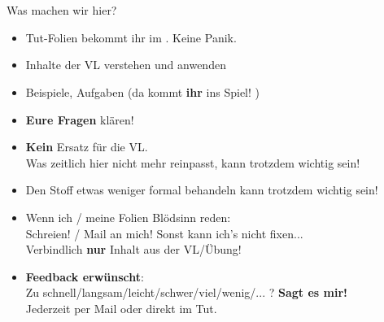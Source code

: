 

\newcommand{\handout}{}





\section{}


\begin{frame}[t]{Was machen wir hier?}
	\begin{itemize}[<+->]
		\item Tut-Folien bekommt ihr im \ILIAS. Keine Panik.
		\item Inhalte der VL verstehen und anwenden
		\item Beispiele, Aufgaben (da kommt \textbf{ihr} ins Spiel! \smiley)
		\item \textbf{Eure Fragen} klären! 
		\item \textbf{Kein} Ersatz für die VL. \\
			  Was zeitlich hier nicht mehr reinpasst, kann trotzdem wichtig sein!
	    \item Den Stoff etwas weniger formal behandeln \impl {} kann trotzdem wichtig sein! 
	    \item Wenn ich / meine Folien Blödsinn reden: \\
		      Schreien! / Mail an mich! \impl Sonst kann ich's nicht fixen... \frownie \\
		      Verbindlich \textbf{nur} Inhalt aus der VL/Übung! 
		\item \textbf{Feedback erwünscht}: \\
			  Zu schnell/langsam/leicht/schwer/viel/wenig/... ? \impl \textbf{Sagt es mir!}\\
			  Jederzeit per Mail oder direkt im Tut.
	\end{itemize}
\end{frame}

